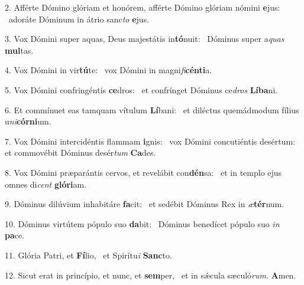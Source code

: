 2. Afférte Dómino glóriam et honórem, afférte Dómino glóriam nómini \textbf{e}jus: \ast\  adoráte Dóminum in átrio sanc\textit{to} \textbf{e}jus.\

3. Vox Dómini super aquas, Deus majestátis in\textbf{tó}nuit: \ast\  Dóminus super a\textit{quas} \textbf{mul}tas.\

4. Vox Dómini in vir\textbf{tú}te: \ast\  vox Dómini in magni\textit{fi}\textbf{cén}\textbf{ti}a.\

5. Vox Dómini confringéntis \textbf{ce}dros: \ast\  et confrínget Dóminus ce\textit{dros} \textbf{Lí}\textbf{ba}ni.\

6. Et commínuet eas tamquam vítulum \textbf{Lí}bani: \ast\  et diléctus quemádmodum fílius u\textit{ni}\textbf{cór}\textbf{ni}um.\

7. Vox Dómini intercidéntis flammam \textbf{i}gnis: \ast\  vox Dómini concutiéntis desértum: et commovébit Dóminus desér\textit{tum} \textbf{Ca}des.\

8. Vox Dómini præparántis cervos, et revelábit con\textbf{dén}sa: \ast\  et in templo ejus omnes di\textit{cent} \textbf{gló}\textbf{ri}am.\

9. Dóminus dilúvium inhabitáre \textbf{fa}cit: \ast\  et sedébit Dóminus Rex in \textit{æ}\textbf{tér}num.\

10. Dóminus virtútem pópulo suo \textbf{da}bit: \ast\  Dóminus benedícet pópulo suo \textit{in} \textbf{pa}ce.\

11. Glória Patri, et \textbf{Fí}lio, \ast\  et Spirítu\textit{i} \textbf{Sanc}to.\

12. Sicut erat in princípio, et nunc, et \textbf{sem}per, \ast\  et in sǽcula sæculó\textit{rum}. \textbf{A}men.\

